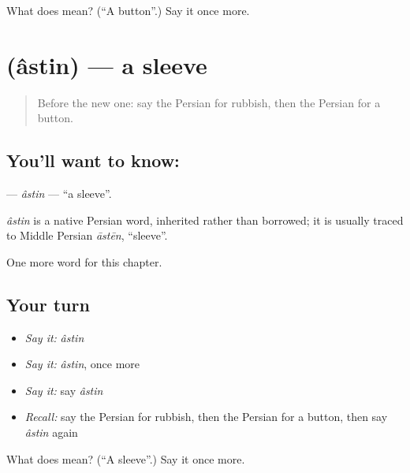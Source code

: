 \begin{tcolorbox}[breakable,colback=teal!4,colframe=teal!35!black,title={Before you move on}]
What does  mean? (\textquotedblleft{}A button\textquotedblright{}.) Say it once more.
\end{tcolorbox}
\section[\texorpdfstring{\fa{آستین} (âstin)}{آستین (âstin)}]{ (âstin) — a sleeve}

\label{lesson:FA-C240-astin}



\begin{quote}
Before the new one: say the Persian for rubbish, then the Persian for a button.
\end{quote}

\subsection*{You'll want to know: }
\textbf{} — \emph{âstin} — \textquotedblleft{}a sleeve\textquotedblright{}.

\begin{cousinweb}
\emph{âstin} is a native Persian word, inherited rather than borrowed; it is usually traced to Middle Persian \emph{āstēn}, \textquotedblleft{}sleeve\textquotedblright{}.
\end{cousinweb}

\begin{grammarlens}[title={What you've built}]
One more word for this chapter.
\end{grammarlens}

\subsection*{Your turn}
\begin{itemize}
\raggedright
  \item \emph{Say it:} \emph{âstin}
  \item \emph{Say it:} \emph{âstin}, once more
  \item \emph{Say it:} say \emph{âstin}
  \item \emph{Recall:} say the Persian for rubbish, then the Persian for a button, then say \emph{âstin} again
\end{itemize}

\begin{tcolorbox}[breakable,colback=teal!4,colframe=teal!35!black,title={Before you move on}]
What does  mean? (\textquotedblleft{}A sleeve\textquotedblright{}.) Say it once more.
\end{tcolorbox}
